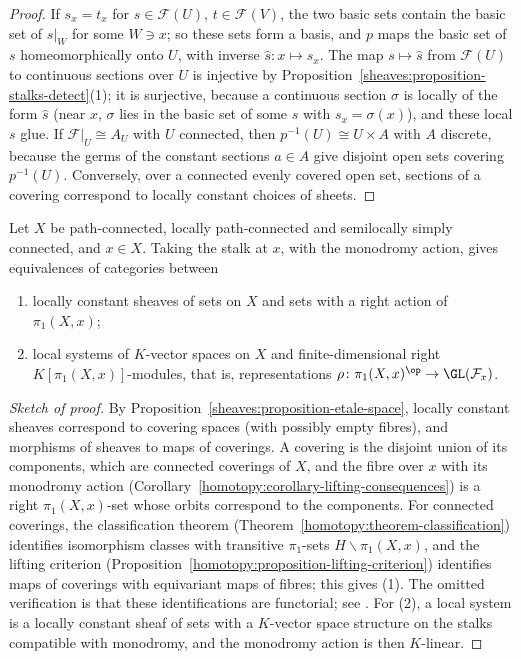 \begin{proof}
If $s_x = t_x$ for $s \in \mathcal{F}(U)$, $t \in \mathcal{F}(V)$, the two basic sets contain the basic set of $s|_W$ for some $W \ni x$; so these sets form a basis, and $p$ maps the basic
set of $s$ homeomorphically onto $U$, with inverse $\hat{s} \colon x \mapsto s_x$. The map $s \mapsto \hat{s}$ from $\mathcal{F}(U)$ to continuous sections over $U$ is injective by
Proposition~\ref{sheaves:proposition-stalks-detect}(1); it is surjective, because a continuous section $\sigma$ is locally of the form $\hat{s}$ (near $x$, $\sigma$ lies in the basic
set of some $s$ with $s_x = \sigma(x)$), and these local $s$ glue. If $\mathcal{F}|_U \cong A_U$ with $U$ connected, then $p^{-1}(U) \cong U \times A$ with $A$ discrete, because the germs of
the constant sections $a \in A$ give disjoint open sets covering $p^{-1}(U)$. Conversely, over a connected evenly covered open set, sections of a covering correspond to locally constant
choices of sheets.
\end{proof}

\begin{theorem}\label{sheaves:theorem-local-systems-representations}
Let $X$ be path-connected, locally path-connected and semilocally simply connected, and $x \in X$. Taking the stalk at $x$, with the monodromy action, gives equivalences of
categories between
\begin{enumerate}
\item locally constant sheaves of sets on $X$ and sets with a right action of $\pi_1(X, x)$;
\item local systems of $K$-vector spaces on $X$ and finite-dimensional right $K[\pi_1(X, x)]$-modules, that is, representations
$\rho \colon \pi_1(X, x)^{\op} \to \GL(\mathcal{F}_x)$.
\end{enumerate}
\end{theorem}

\begin{proof}[Sketch of proof]
By Proposition~\ref{sheaves:proposition-etale-space}, locally constant sheaves correspond to covering spaces (with possibly empty fibres), and morphisms of sheaves to maps of
coverings. A covering is the disjoint union of its components, which are connected coverings of $X$, and the fibre over $x$ with its monodromy action
(Corollary~\ref{homotopy:corollary-lifting-consequences}) is a right $\pi_1(X, x)$-set whose orbits correspond to the components. For connected coverings, the classification
theorem (Theorem~\ref{homotopy:theorem-classification}) identifies isomorphism classes with transitive $\pi_1$-sets $H\backslash\pi_1(X, x)$, and the lifting criterion
(Proposition~\ref{homotopy:proposition-lifting-criterion}) identifies maps of coverings with equivariant maps of fibres; this gives (1). The omitted verification is that these
identifications are functorial; see \cite[Chapter 2]{szamuely-galois}. For (2), a local system is a locally constant sheaf of sets with a $K$-vector space structure on the stalks
compatible with monodromy, and the monodromy action is then $K$-linear.
\end{proof}

